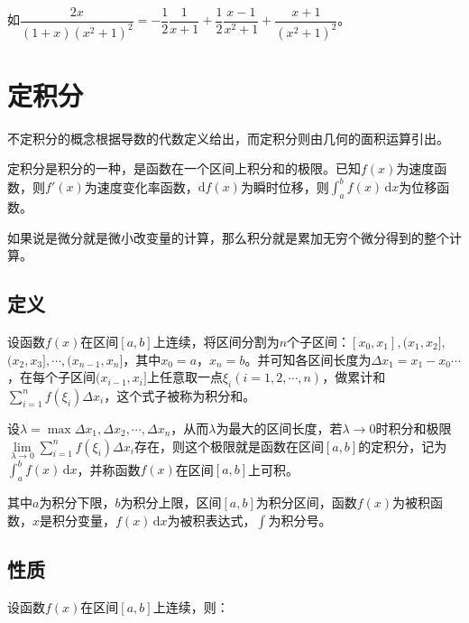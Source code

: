 \documentclass[UTF8, 12pt]{ctexart}
\begin{document}
如$\dfrac{2x}{(1+x)(x^2+1)^2}=-\dfrac{1}{2}\dfrac{1}{x+1}+\dfrac{1}{2}\dfrac{x-1}{x^2+1}+\dfrac{x+1}{(x^2+1)^2}$。

\section{定积分}

不定积分的概念根据导数的代数定义给出，而定积分则由几何的面积运算引出。

定积分是积分的一种，是函数在一个区间上积分和的极限。已知$f(x)$为速度函数，则$f'(x)$为速度变化率函数，$\textrm{d}f(x)$为瞬时位移，则$\int_{a}^bf(x)\,\textrm{d}x$为位移函数。

如果说是微分就是微小改变量的计算，那么积分就是累加无穷个微分得到的整个计算。

\subsection{定义}

设函数$f(x)$在区间$[a,b]$上连续，将区间分割为$n$个子区间：$[x_0,x_1],(x_1,x_2],$\\$(x_2,x_3],\cdots,(x_{n-1},x_n]$，其中$x_0=a$，$x_n=b$。并可知各区间长度为$\Delta x_1=x_1-x_0\cdots$，在每个子区间$(x_{i-1},x_i]$上任意取一点$\xi_i(i=1,2,\cdots,n)$，做累计和$\sum\limits_{i=1}^nf(\xi_i)\Delta x_i$，这个式子被称为积分和。

设$\lambda=\max{\Delta x_1,\Delta x_2,\cdots,\Delta x_n}$，从而$\lambda$为最大的区间长度，若$\lambda\to 0$时积分和极限$\lim\limits_{\lambda\to 0}\sum\limits_{i=1}^nf(\xi_i)\Delta x_i$存在，则这个极限就是函数在区间$[a,b]$的定积分，记为$\int_a^bf(x)\,\textrm{d}x$，并称函数$f(x)$在区间$[a,b]$上可积。

其中$a$为积分下限，$b$为积分上限，区间$[a,b]$为积分区间，函数$f(x)$为被积函数，$x$是积分变量，$f(x)\,\textrm{d}x$为被积表达式，$\int$为积分号。

\subsection{性质}

设函数$f(x)$在区间$[a,b]$上连续，则：
\end{document}

